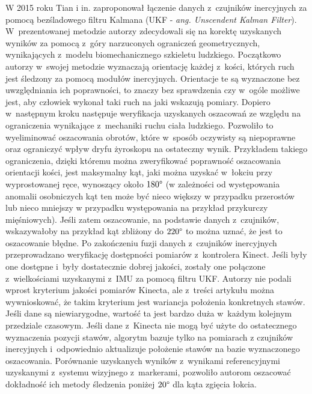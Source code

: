 W 2015 roku Tian i in. \cite{Tian2015a} zaproponował łączenie danych z~czujników inercyjnych za pomocą bezśladowego filtru Kalmana (UKF - \emph{ang. Unscendent Kalman Filter}). W~prezentowanej metodzie autorzy zdecydowali się na korektę uzyskanych wyników za pomocą z~góry narzuconych ograniczeń geometrycznych, wynikających z~modelu biomechanicznego szkieletu ludzkiego. Początkowo autorzy w~swojej metodzie wyznaczają orientację każdej z~kości, których ruch jest śledzony za pomocą modułów inercyjnych. Orientacje te są wyznaczone bez uwzględniania ich poprawności, to znaczy bez sprawdzenia czy w~ogóle możliwe jest, aby człowiek wykonał taki ruch na jaki wskazują pomiary. Dopiero w~następnym kroku następuje weryfikacja uzyskanych oszacowań ze względu na ograniczenia wynikające z~mechaniki ruchu ciała ludzkiego. Pozwoliło to wyeliminować oszacowania obrotów, które w~sposób oczywisty są niepoprawne oraz ograniczyć wpływ dryfu żyroskopu na ostateczny wynik. Przykładem takiego ograniczenia, dzięki któremu można zweryfikować poprawność oszacowania orientacji kości, jest maksymalny kąt, jaki można uzyskać w~łokciu przy wyprostowanej ręce, wynoszący około $180\degree$ (w zależności od występowania anomalii osobniczych kąt ten może być nieco większy w przypadku przerostów lub nieco mniejszy w przypadku występowania na przykład przykurczy mięśniowych). Jeśli zatem oszacowanie, na podstawie danych z~czujników, wskazywałoby na przykład kąt zbliżony do $220\degree$ to można uznać, że jest to oszacowanie błędne. Po zakończeniu fuzji danych z~czujników inercyjnych przeprowadzano weryfikację dostępności pomiarów z~kontrolera Kinect. Jeśli były one dostępne i~były dostatecznie dobrej jakości, zostały one połączone z~wielkościami uzyskanymi z~IMU za pomocą filtru UKF. Autorzy nie podali wprost kryterium jakości pomiarów Kinecta, ale z~treści artykułu można wywnioskować, że takim kryterium jest wariancja położenia konkretnych stawów. Jeśli dane są niewiarygodne, wartość ta jest bardzo duża w~każdym kolejnym przedziale czasowym. Jeśli dane z~Kinecta nie mogą być użyte do ostatecznego wyznaczenia pozycji stawów, algorytm bazuje tylko na pomiarach z czujników inercyjnych i~odpowiednio aktualizuje położenie stawów na bazie wyznaczonego oszacowania. Porównanie uzyskanych wyników z~wynikami referencyjnymi uzyskanymi z~systemu wizyjnego z~markerami, pozwoliło autorom oszacować dokładność ich metody śledzenia poniżej $20\degree$ dla kąta zgięcia łokcia.																																																	

